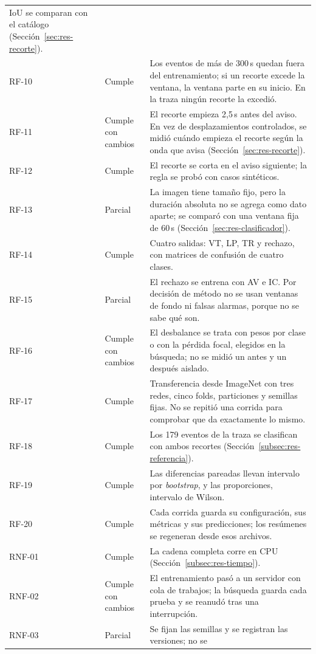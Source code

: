 {\begin{longtable}{>{\raggedright\arraybackslash}p{1.4cm}>{\raggedright\arraybackslash}p{2.2cm}>{\raggedright\arraybackslash}p{8.8cm}}
IoU se comparan con el catálogo (Sección~\ref{sec:res-recorte}). \\
RF-10 & Cumple & Los eventos de más de 300\,s quedan fuera del entrenamiento;
si un recorte excede la ventana, la ventana parte en su inicio. En la traza
ningún recorte la excedió. \\
RF-11 & Cumple con cambios & El recorte empieza 2,5\,s antes del aviso. En vez
de desplazamientos controlados, se midió cuándo empieza el recorte según la
onda que avisa (Sección~\ref{sec:res-recorte}). \\
RF-12 & Cumple & El recorte se corta en el aviso siguiente; la regla se probó
con casos sintéticos. \\
RF-13 & Parcial & La imagen tiene tamaño fijo, pero la duración absoluta no se
agrega como dato aparte; se comparó con una ventana fija de 60\,s
(Sección~\ref{sec:res-clasificador}). \\
RF-14 & Cumple & Cuatro salidas: VT, LP, TR y rechazo, con matrices de
confusión de cuatro clases. \\
RF-15 & Parcial & El rechazo se entrena con AV e IC. Por decisión de método no
se usan ventanas de fondo ni falsas alarmas, porque no se sabe qué son. \\
RF-16 & Cumple con cambios & El desbalance se trata con pesos por clase o con
la pérdida focal, elegidos en la búsqueda; no se midió un antes y un después
aislado. \\
RF-17 & Cumple & Transferencia desde ImageNet con tres redes, cinco folds,
particiones y semillas fijas. No se repitió una corrida para comprobar que da
exactamente lo mismo. \\
RF-18 & Cumple & Los 179 eventos de la traza se clasifican con ambos recortes
(Sección~\ref{subsec:res-referencia}). \\
RF-19 & Cumple & Las diferencias pareadas llevan intervalo por
\emph{bootstrap}, y las proporciones, intervalo de Wilson. \\
RF-20 & Cumple & Cada corrida guarda su configuración, sus métricas y sus
predicciones; los resúmenes se regeneran desde esos archivos. \\
\midrule
RNF-01 & Cumple & La cadena completa corre en CPU
(Sección~\ref{subsec:res-tiempo}). \\
RNF-02 & Cumple con cambios & El entrenamiento pasó a un servidor con cola de
trabajos; la búsqueda guarda cada prueba y se reanudó tras una
interrupción. \\
RNF-03 & Parcial & Se fijan las semillas y se registran las versiones; no se

\end{longtable}}
